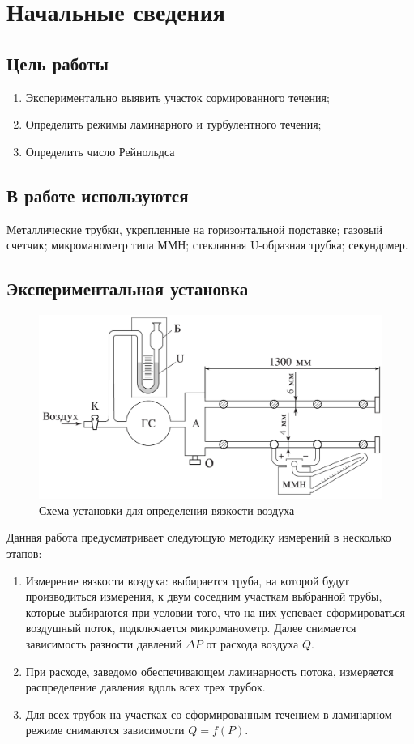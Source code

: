 \documentclass{letnab}
\begin{document}
	\large

\section{Начальные сведения}
\subsection*{Цель работы}
\begin{enumerate}
\item Экспериментально выявить участок сормированного течения;
\item Определить режимы ламинарного и турбулентного течения;
\item Определить число Рейнольдса
\end{enumerate}
\subsection*{В работе используются}
\par Металлические трубки, укрепленные на горизонтальной подставке; газовый счетчик; микроманометр типа ММН; стеклянная U-образная трубка; секундомер.

\subsection*{Экспериментальная установка}
\begin{figure}[H]
	\includegraphics[width = 150 mm]{the_station.png}
	\caption{Схема установки для определения вязкости воздуха}
\end{figure}

Данная работа предусматривает следующую методику измерений в несколько этапов:
\begin{enumerate}
	\item Измерение вязкости воздуха: выбирается труба, на которой будут производиться измерения, к двум соседним участкам выбранной трубы, которые выбираются при условии того, что на них успевает сформироваться воздушный поток, подключается микроманометр. Далее снимается зависимость разности давлений $\Delta P$ от расхода воздуха $Q$.
	\item При расходе, заведомо обеспечивающем ламинарность потока, измеряется распределение давления вдоль всех трех трубок.
	\item Для всех трубок на участках со сформированным течением в ламинарном режиме снимаются зависимости $Q = f(P)$. 
\end{enumerate}
\end{document}
